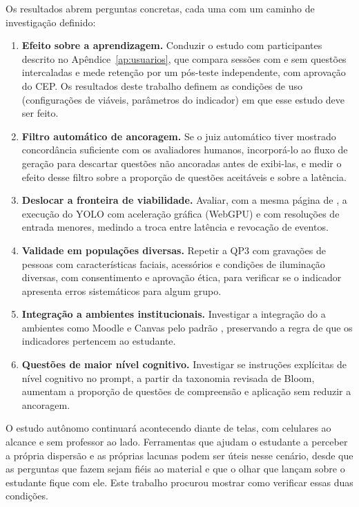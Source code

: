 Os resultados abrem perguntas concretas, cada uma com um caminho de investigação definido:

\begin{enumerate}
  \item \textbf{Efeito sobre a aprendizagem.} Conduzir o estudo com participantes descrito no Apêndice~\ref{ap:usuarios}, que compara sessões com e sem questões intercaladas e mede retenção por um pós-teste independente, com aprovação do CEP. Os resultados deste trabalho definem as condições de uso (configurações de  viáveis, parâmetros do indicador) em que esse estudo deve ser feito.
  \item \textbf{Filtro automático de ancoragem.} Se o juiz automático tiver mostrado concordância suficiente com os avaliadores humanos, incorporá-lo ao fluxo de geração para descartar questões não ancoradas antes de exibi-las, e medir o efeito desse filtro sobre a proporção de questões aceitáveis e sobre a latência.
  \item \textbf{Deslocar a fronteira de viabilidade.} Avaliar, com a mesma página de , a execução do YOLO com aceleração gráfica (WebGPU) e com resoluções de entrada menores, medindo a troca entre latência e revocação de eventos.
  \item \textbf{Validade em populações diversas.} Repetir a QP3 com gravações de pessoas com características faciais, acessórios e condições de iluminação diversas, com consentimento e aprovação ética, para verificar se o indicador apresenta erros sistemáticos para algum grupo.
  \item \textbf{Integração a ambientes institucionais.} Investigar a integração do \ferramenta a ambientes como Moodle e Canvas pelo padrão  , preservando a regra de que os indicadores pertencem ao estudante.
  \item \textbf{Questões de maior nível cognitivo.} Investigar se instruções explícitas de nível cognitivo no prompt, a partir da taxonomia revisada de Bloom, aumentam a proporção de questões de compreensão e aplicação sem reduzir a ancoragem.
\end{enumerate}

O estudo autônomo continuará acontecendo diante de telas, com celulares ao alcance e sem professor ao lado. Ferramentas que ajudam o estudante a perceber a própria dispersão e as próprias lacunas podem ser úteis nesse cenário, desde que as perguntas que fazem sejam fiéis ao material e que o olhar que lançam sobre o estudante fique com ele. Este trabalho procurou mostrar como verificar essas duas condições.
